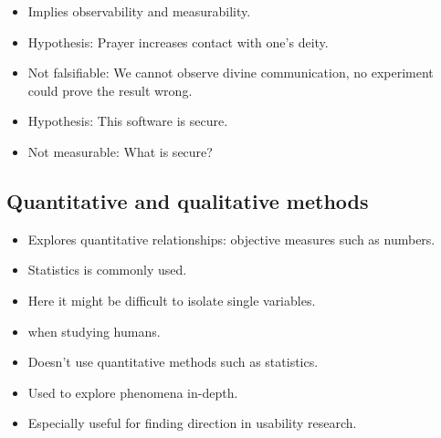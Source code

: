 \begin{frame}
  \begin{example}
    \begin{itemize}
      \item Implies observability and measurability.
      \item Hypothesis: Prayer increases contact with one's deity.
      \item Not falsifiable: We cannot observe divine communication, no 
        experiment could prove the result wrong.
    \end{itemize}
  \end{example}

  \pause

  \begin{example}
    \begin{itemize}
      \item Hypothesis: This software is secure.
      \item Not measurable: What is secure?
    \end{itemize}
  \end{example}
\end{frame}

\subsection{Quantitative and qualitative methods}

\begin{frame}
  \begin{definition}
    \begin{itemize}
      \item Explores quantitative relationships: objective measures such as 
        numbers.
      \item Statistics is commonly used.
      \item Here it might be difficult to isolate single variables.
      \item \Eg when studying humans.
    \end{itemize}
  \end{definition}

  \begin{definition}
    \begin{itemize}
      \item Doesn't use quantitative methods such as statistics.
      \item Used to explore phenomena in-depth.
      \item Especially useful for finding direction in usability research.
    \end{itemize}
  \end{definition}
\end{frame}

